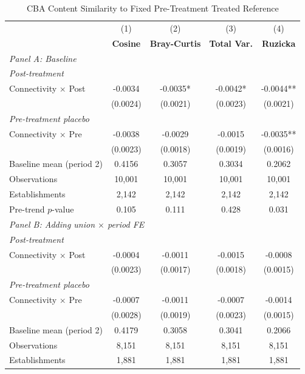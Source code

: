 \begin{table}[H]
\centering
\caption{CBA Content Similarity to Fixed Pre-Treatment Treated Reference}
\label{tab:pretreat_ref_cba_similarity}
\scriptsize
\setlength{\tabcolsep}{8pt}
\begin{tabular}{lcccc}
\hline\hline
 & (1) & (2) & (3) & (4) \\
 & \textbf{Cosine} & \textbf{Bray-Curtis} & \textbf{Total Var.} & \textbf{Ruzicka} \\
\hline
\multicolumn{5}{l}{\textit{Panel A: Baseline}} \\
\multicolumn{5}{l}{\textit{Post-treatment}} \\
Connectivity $\times$ Post & -0.0034 & -0.0035* & -0.0042* & -0.0044** \\
 & (0.0024) & (0.0021) & (0.0023) & (0.0021) \\
\multicolumn{5}{l}{\textit{Pre-treatment placebo}} \\
Connectivity $\times$ Pre & -0.0038 & -0.0029 & -0.0015 & -0.0035** \\
 & (0.0023) & (0.0018) & (0.0019) & (0.0016) \\
\hline
Baseline mean (period 2) & 0.4156 & 0.3057 & 0.3034 & 0.2062 \\
Observations &       10,001 &       10,001 &       10,001 &       10,001 \\
Establishments &        2,142 &        2,142 &        2,142 &        2,142 \\
Pre-trend $p$-value & 0.105 & 0.111 & 0.428 & 0.031 \\
\hline
\multicolumn{5}{l}{\textit{Panel B: Adding union $\times$ period FE}} \\
\multicolumn{5}{l}{\textit{Post-treatment}} \\
Connectivity $\times$ Post & -0.0004 & -0.0011 & -0.0015 & -0.0008 \\
 & (0.0023) & (0.0017) & (0.0018) & (0.0015) \\
\multicolumn{5}{l}{\textit{Pre-treatment placebo}} \\
Connectivity $\times$ Pre & -0.0007 & -0.0011 & -0.0007 & -0.0014 \\
 & (0.0028) & (0.0019) & (0.0023) & (0.0015) \\
\hline
Baseline mean (period 2) & 0.4179 & 0.3058 & 0.3041 & 0.2066 \\
Observations &        8,151 &        8,151 &        8,151 &        8,151 \\
Establishments &        1,881 &        1,881 &        1,881 &        1,881 \\

\end{tabular}
\end{table}
